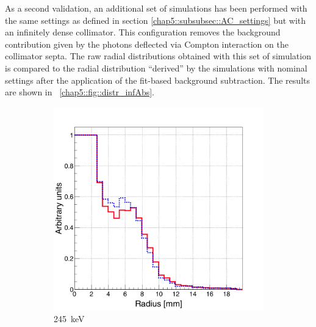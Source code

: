 As a second validation, an additional set of simulations has been performed with the same settings as defined in section \ref{chap5::subsubsec::AC_settings} but with an infinitely dense collimator. This configuration removes the background contribution given by the photons deflected via Compton interaction on the collimator septa. The raw radial distributions obtained with this set of simulation is compared to the radial distribution \enquote{derived} by the simulations with nominal settings after the application of the fit-based background subtraction. The results are shown in \figurename~\ref{chap5::fig::distr_infAbs}.

\begin{figure}
\begin{subfigure}{.5\textwidth}
  \centering
  \includegraphics[width=.9\linewidth]{03_GraphicFiles/chapter5_SPECTsimu/SPECT/anger/inf_abs/overlap_infAbs_245keV_normMax}
  \caption{245~keV}
  \label{chap5::fig::rad_distr_infAbs_245keV}
\end{subfigure}
\begin{subfigure}{.5\textwidth}
  \centering

\end{subfigure}
\end{figure}
